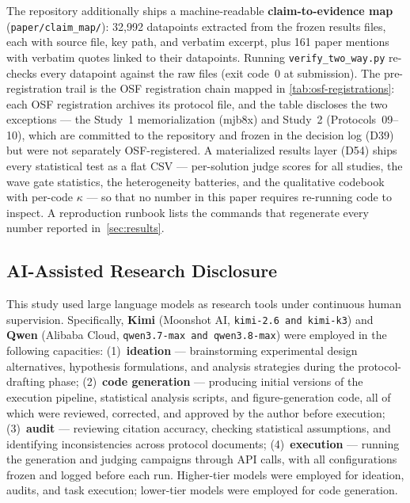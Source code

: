\documentclass[12pt,a4paper]{article}
\begin{document}
The repository additionally ships a machine-readable \textbf{claim-to-evidence
map} (\texttt{paper/claim\_map/}): 32{,}992 datapoints extracted from the
frozen results files, each with source file, key path, and verbatim excerpt,
plus 161 paper mentions with verbatim quotes linked to their datapoints.
Running \texttt{verify\_two\_way.py} re-checks every datapoint against the
raw files (exit code~0 at submission). The pre-registration trail is the OSF
registration chain mapped in \cref{tab:osf-registrations}: each OSF
registration archives its protocol file, and the table discloses the two
exceptions --- the Study~1 memorialization (mjb8x) and Study~2
(Protocols~09--10), which are committed to the repository and frozen in the
decision log (D39) but were not separately OSF-registered.
A materialized results layer (D54) ships every statistical test as a flat CSV
--- per-solution judge scores for all studies, the wave gate statistics, the
heterogeneity batteries, and the qualitative codebook with per-code $\kappa$
--- so that no number in this paper requires re-running code to inspect.
A reproduction runbook
\citep{SandveEtAl2013} lists the commands that regenerate every number reported
in~\cref{sec:results}.

\subsection{AI-Assisted Research Disclosure}\label{sec:ai-disclosure}

This study used large language models as research tools under continuous human
supervision. Specifically, \textbf{Kimi} (Moonshot AI, \texttt{kimi-2.6 and kimi-k3}) and
\textbf{Qwen} (Alibaba Cloud, \texttt{qwen3.7-max and qwen3.8-max}) were employed in the
following capacities: (1)~\textbf{ideation} --- brainstorming experimental
design alternatives, hypothesis formulations, and analysis strategies during the
protocol-drafting phase; (2)~\textbf{code generation} --- producing initial
versions of the execution pipeline, statistical analysis scripts, and
figure-generation code, all of which were reviewed, corrected, and approved by
the author before execution; (3)~\textbf{audit} --- reviewing citation accuracy,
checking statistical assumptions, and identifying inconsistencies across
protocol documents; (4)~\textbf{execution} --- running the generation and
judging campaigns through API calls, with all configurations frozen and logged
before each run. Higher-tier models were employed for ideation, audits, and
task execution; lower-tier models were employed for code generation.
\end{document}
